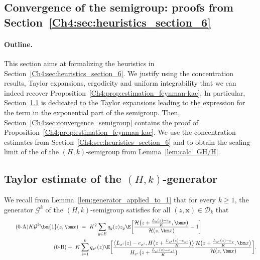 \begin{refsegment}
\section{Convergence of the semigroup: proofs from Section~\ref{Ch4:sec:heuristics_section_6}}\label{Ch4:sec:convergence}

\paragraph{Outline.}
This section aims at formalizing the heuristics in Section~\ref{Ch4:sec:heuristics_section_6}. We justify using the concentration results, Taylor expansions, ergodicity and uniform integrability that we can indeed recover Proposition~\ref{Ch4:prop:estimation_feynman-kac}. In particular,  Section~\ref{Ch4:sec:proof_Adg_Dg} is dedicated to the Taylor expansions leading to the expression for the term in the exponential part of the semigroup. Then, Section~\ref{Ch4:sec:convergence_semigroup} contains the proof of  Proposition~\ref{Ch4:prop:estimation_feynman-kac}. We use the concentration estimates from Section~\ref{Ch4:sec:heuristics_section_6} and to obtain the scaling limit of the of the $(H,k)$-semigroup from Lemma~\ref{lem:calc_GH/H}.
 

\subsection{Taylor estimate of the $(H,k)$-generator}\label{Ch4:sec:proof_Adg_Dg}


We recall from Lemma~\ref{lem:generator_applied_to_1} that for every $k\geq 1$, the generator $\mathcal{G}^k$ of the  $(H,k)$-semigroup satisfies for all $(z,\bm x)\in \mathscr{D}_{k}$ that
\begin{align} \label{Ch4:eq:taylor_dvp_A}\tag{\theequation-A}
K\mathcal{G}^k\bm{1}(z,\bm x)\ &=\  K^2\sum_{y\in E}q_{y}(z) z_y  \E\bigg[\frac{ \mathcal{H}\big(z+ \frac{L_y(z) -e_{y}}{K},\bm x\big)}{\mathcal{H}(z, \bm x ) } - 1\bigg] \\\label{Ch4:eq:taylor_dvp_B}\tag{\theequation-B}
+\   K &\sum_{i=1}^k  q_{x^i}(z)\E\bigg[\frac{\big\langle L_{x^i}(z) -e_{x^i}, H\big(z+ \frac{L_{x^i}(z) -e_{x^i}}{K} \big)\big\rangle}{H_{x^i}\big(z+ \frac{L_{x^i}(z) -e_{x^i}}{K}\big)}\frac{ \mathcal{H}\big(z+ \frac{L_{x^i}(z) -e_{y}}{K},\bm x\big)}{\mathcal{H}(z, \bm x ) } \bigg].
\end{align}


\end{refsegment}

